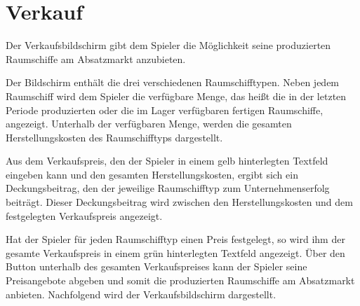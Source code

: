 \section{Verkauf}
\label{sec:ui-verkauf}

Der Verkaufsbildschirm gibt dem Spieler die Möglichkeit seine produzierten Raumschiffe am Absatzmarkt anzubieten.
 
Der Bildschirm enthält die drei verschiedenen Raumschifftypen. Neben jedem Raumschiff wird dem Spieler die verfügbare Menge, das heißt die in der letzten Periode produzierten oder die im Lager verfügbaren fertigen Raumschiffe, angezeigt. Unterhalb der verfügbaren Menge, werden die gesamten Herstellungskosten des Raumschifftyps dargestellt. 
 
Aus dem Verkaufspreis, den der Spieler in einem gelb hinterlegten Textfeld eingeben kann und den gesamten Herstellungskosten, ergibt sich ein Deckungsbeitrag, den der jeweilige Raumschifftyp zum Unternehmenserfolg beiträgt. Dieser Deckungsbeitrag wird zwischen den Herstellungskosten und dem festgelegten Verkaufspreis angezeigt.
 
Hat der Spieler für jeden Raumschifftyp einen Preis festgelegt, so wird ihm der gesamte Verkaufspreis in einem grün hinterlegten Textfeld angezeigt. Über den Button unterhalb des gesamten Verkaufspreises kann der Spieler seine Preisangebote abgeben und somit die produzierten Raumschiffe am Absatzmarkt anbieten.  Nachfolgend wird der Verkaufsbildschirm dargestellt.

\autorende{}